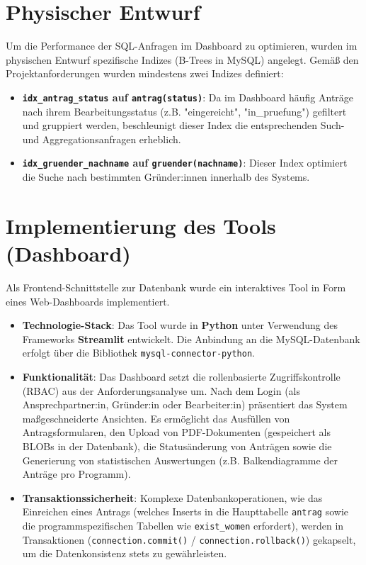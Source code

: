 \documentclass{article}
\begin{document}
\section{Physischer Entwurf}
Um die Performance der SQL-Anfragen im Dashboard zu optimieren, wurden im physischen Entwurf spezifische Indizes (B-Trees in MySQL) angelegt. Gemäß den Projektanforderungen wurden mindestens zwei Indizes definiert:
\begin{itemize}
    \item \textbf{\texttt{idx\_antrag\_status} auf \texttt{antrag(status)}}: Da im Dashboard häufig Anträge nach ihrem Bearbeitungsstatus (z.B. "eingereicht", "in\_pruefung") gefiltert und gruppiert werden, beschleunigt dieser Index die entsprechenden Such- und Aggregationsanfragen erheblich.
    \item \textbf{\texttt{idx\_gruender\_nachname} auf \texttt{gruender(nachname)}}: Dieser Index optimiert die Suche nach bestimmten Gründer:innen innerhalb des Systems.
\end{itemize}

\section{Implementierung des Tools (Dashboard)}
Als Frontend-Schnittstelle zur Datenbank wurde ein interaktives Tool in Form eines Web-Dashboards implementiert. 
\begin{itemize}
    \item \textbf{Technologie-Stack}: Das Tool wurde in \textbf{Python} unter Verwendung des Frameworks \textbf{Streamlit} entwickelt. Die Anbindung an die MySQL-Datenbank erfolgt über die Bibliothek \texttt{mysql-connector-python}.
    \item \textbf{Funktionalität}: Das Dashboard setzt die rollenbasierte Zugriffskontrolle (RBAC) aus der Anforderungsanalyse um. Nach dem Login (als Ansprechpartner:in, Gründer:in oder Bearbeiter:in) präsentiert das System maßgeschneiderte Ansichten. Es ermöglicht das Ausfüllen von Antragsformularen, den Upload von PDF-Dokumenten (gespeichert als BLOBs in der Datenbank), die Statusänderung von Anträgen sowie die Generierung von statistischen Auswertungen (z.B. Balkendiagramme der Anträge pro Programm).
    \item \textbf{Transaktionssicherheit}: Komplexe Datenbankoperationen, wie das Einreichen eines Antrags (welches Inserts in die Haupttabelle \texttt{antrag} sowie die programmspezifischen Tabellen wie \texttt{exist\_women} erfordert), werden in Transaktionen (\texttt{connection.commit()} / \texttt{connection.rollback()}) gekapselt, um die Datenkonsistenz stets zu gewährleisten.
\end{itemize}
\end{document}
